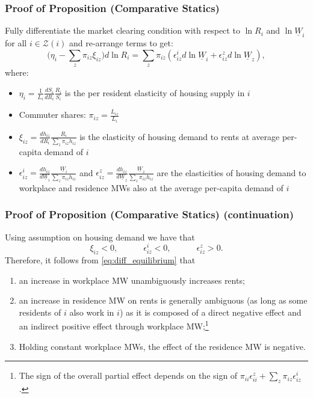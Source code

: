 \documentclass[aspectratio=169, t]{beamer}
\newcommand{\Z}{\mathcal{Z}}
\newcommand{\MW}{\underline{W}}
\begin{document}
\begin{frame}[label = proof_comp_stat]
\frametitle{Proof of Proposition (Comparative Statics)}

    Fully differentiate the market clearing condition with respect to $\ln R_i$ and 
    $\ln \MW_i$ for all $i\in\Z(i)$ and re-arrange terms to get:
    \begin{equation}\label{eq:diff_equilibrium}
        \Big(\eta_i - \sum_z \pi_{iz} \xi_{iz} \Big) d \ln R_i
        = 
        \sum_z \pi_{iz} \left(\epsilon_{iz}^i d \ln \MW_i 
                            + \epsilon_{iz}^z d \ln \MW_z \right) ,
    \end{equation}
    where:
    \begin{itemize}
        \item $\eta_i = \frac{1}{L_i} \frac{d S_i}{d R_i} \frac{R_i}{S_i}$ is the per resident elasticity 
        of housing supply in $i$
        \item Commuter shares: $\pi_{iz} = \frac{L_{iz}}{L_i}$
        \item $\xi_{iz} = \frac{d h_{iz}}{d R_i} \frac{R_i}{\sum_z \pi_{iz} h_{iz}}$ is the 
        elasticity of housing demand to rents at average per-capita demand of $i$
        \item  $\epsilon_{iz}^i = \frac{d h_{iz}}{d \MW_i} \frac{\MW_i}{\sum_z \pi_{iz} h_{iz}}$ and 
        $\epsilon_{iz}^z = \frac{d h_{iz}}{d \MW_z} \frac{\MW_z}{\sum_z \pi_{iz} h_{iz}}$ 
        are the elasticities of housing demand to workplace and residence MWs also at
         the average per-capita demand of $i$
    \end{itemize}
\end{frame}

\begin{frame}
    \frametitle{Proof of Proposition (Comparative Statics) (continuation)}
    
    Using assumption on housing demand we have that
    $$
    \xi_{iz} < 0, \quad\quad\quad \epsilon_{iz}^i < 0, \quad\quad\quad \epsilon_{iz}^z > 0 .
    $$
    \vspace{1mm}
    Therefore, it follows from \eqref{eq:diff_equilibrium} that
    \begin{enumerate}
        \item an increase in workplace MW unambiguously increases rents;
        \item an increase in residence MW on rents is generally ambiguous 
        (as long as some residents of $i$ also work in $i$) as it is composed of a direct negative 
        effect and an indirect positive effect through workplace MW;\footnote{The sign of the overall partial effect depends on the sign of 
    $\pi_{ii} \epsilon_{ii}^z + \sum_z \pi_{iz} \epsilon_{iz}^i$.}
        \item Holding constant workplace MWs, the effect of the residence MW is negative.
    \end{enumerate}    
\end{frame}
\end{document}
